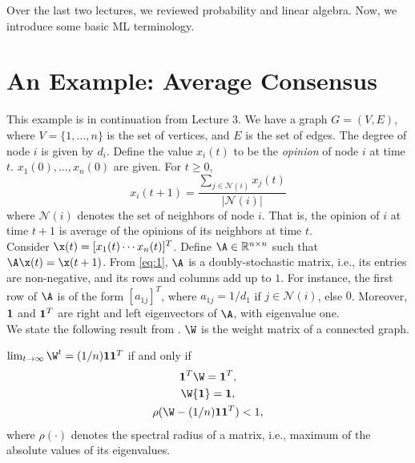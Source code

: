\documentclass[12pt]{article}
\begin{document}
	\MakeScribeTop


\noindent Over the last two lectures, we reviewed probability and linear algebra. Now, we introduce some basic ML terminology.

\section{An Example: Average Consensus}

This example is in continuation from Lecture 3. We have a graph $G = (V,E)$, where $V=\{1,\ldots,n\}$ is the set of vertices, and $E$ is the set of edges. The degree of node $i$ is given by $d_i$. Define the value $x_i(t)$ to be the {\it opinion} of node $i$ at time $t$. ${x_1(0),\dots,x_n(0)}$ are given. For $t\ge 0$,
\begin{equation} \label{eq:1}
	x_i(t+1) = \frac {\sum_{j\in \mathcal{N}(i)} x_j(t)}{|\mathcal{N}(i)|}
\end{equation}
where $\mathcal{N}(i)$ denotes the set of neighbors of node $i$. That is, the opinion of $i$ at time $t+1$ is average of the opinions of its neighbors at time $t$.
\\

\noindent Consider $\x(t) = [x_1(t) \cdots x_n(t)]^T$. Define $\A \in \mathbb{R}^{n\times n}$ such that $\A\x(t) = \x(t+1)$. From \eqref{eq:1}, $\A$ is a doubly-stochastic matrix, i.e., its entries are non-negative, and its rows and columns add up to $1$. For instance, the first row of $\A$ is of the form $[a_{1j}]^T$, where $a_{1j}=1/d_1$ if $j\in \mathcal{N}(i)$, else $0$. Moreover, ${\bf 1}$ and ${\bf 1}^T$ are right and left eigenvectors of $\A$, with eigenvalue one.
\\

\noindent We state the following result from \cite{averageconsensus}. $\W$ is the weight matrix of a connected graph.
\begin{theorem}
	$\lim_{t \to \infty} \W^t = (1/n){\bf 1}{\bf 1}^T$ if and only if
	\begin{gather}
		{\bf 1}^T\W = {\bf 1}^T, \label{eq:2} \\
		\W{\bf 1} = {\bf 1}, \label{eq:3} \\
		\rho(\W - (1/n){\bf 1}{\bf 1}^T) < 1, \label{eq:4}
	\end{gather}
	where $\rho(\cdot)$ denotes the spectral radius of a matrix, i.e., maximum of the absolute values of its eigenvalues.
\end{theorem}
\end{document}
